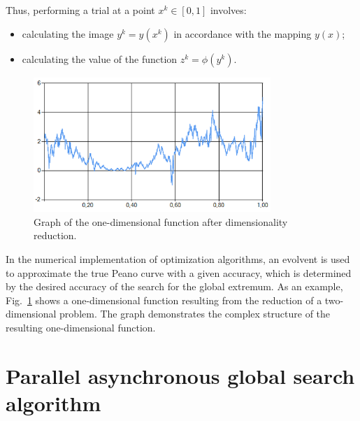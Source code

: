\documentclass[runningheads]{llncs}
\begin{document}
Thus, performing a trial at a point $x^k \in [0,1]$ involves:
\begin{itemize}
    \item calculating the image $y^k=y(x^k)$ in accordance with the mapping $y(x)$;
    \item calculating the value of the function $z^k=\phi(y^k)$.
\end{itemize}

\begin{figure}
\center
\includegraphics[width=0.8\textwidth]{fig1.png}
\caption{Graph of the one-dimensional function after dimensionality reduction.} \label{fig1}
\end{figure}

In the numerical implementation of optimization algorithms, an evolvent is used to approximate the true Peano curve with a given accuracy, which is determined by the desired accuracy of the search for the global extremum. As an example, Fig.~\ref{fig1} shows a one-dimensional function resulting from the reduction of a two-dimensional problem. The graph demonstrates the complex structure of the resulting one-dimensional function.

\section{Parallel asynchronous global search algorithm}\label{sec:PA}
\end{document}
